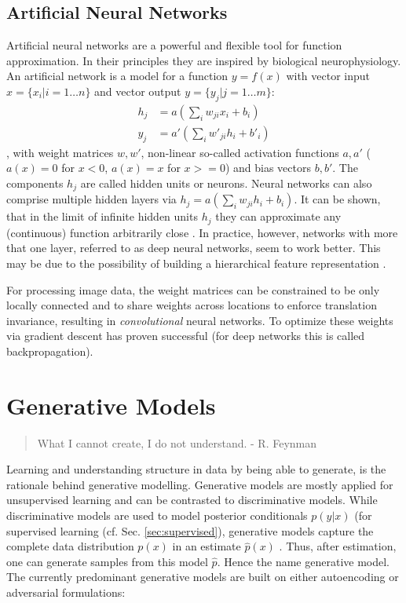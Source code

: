 	\subsection{Artificial Neural Networks}\label{sec:neuralnetworks}
		Artificial neural networks are a powerful and flexible tool for function approximation. In their principles they are inspired by biological neurophysiology. An artificial network is a model for a function $y = f(x)$ with vector input $x = \{ x_i | i = 1 \ldots n \}$ and vector output $y = \{ y_j | j = 1 \ldots m \}$:
		\begin{equation} \label{eq1}
			\begin{split}
				h_j & =  a (\sum_i w_{ji} x_i + b_i)  \\
				y_j & =  a' (\sum_i w'_{ji} h_i + b'_i)
			\end{split}
		\end{equation},
		with weight matrices $w, w'$, non-linear so-called activation functions $a, a'$ (\eg $a(x)=0$ for $x<0$, $a(x)=x$ for $x>=0$) and bias vectors $b, b'$.
		The components $h_j$ are called hidden units or neurons. Neural networks can also comprise multiple hidden layers via $h_j  =  a (\sum_i w_{ji} h_i + b_i)$.
		It can be shown, that in the limit of infinite hidden units $h_j$ they can approximate any (continuous) function arbitrarily close \cite{cybenko89approx, hornik91approx}.
		In practice, however, networks with more that one layer, referred to as deep neural networks, seem to work better. This may be due to the possibility of building a hierarchical feature representation \cite{zeiler14vis}.

		For processing image data, the weight matrices can be constrained to be only locally connected and to share weights across locations to enforce translation invariance, resulting in \textit{convolutional} neural networks.
		To optimize these weights via gradient descent has proven successful (for deep networks this is called backpropagation).

\newpage
\section{Generative Models}\label{sec:genmodel}
	\begin{quote}
	    What I cannot create, I do not understand. - R. Feynman
	\end{quote}
	Learning and understanding structure in data by being able to generate, is the rationale behind generative modelling.
	Generative models are mostly applied for unsupervised learning and can be contrasted to discriminative models. While discriminative models are used to model posterior conditionals $p(y|x)$ (\eg for supervised learning (cf. Sec. \ref{sec:supervised}), generative models capture the complete data distribution $p(x)$ in an estimate $\hat p(x)$ \cite{bishop06pattern}. Thus, after estimation, one can generate samples from this model $\hat p$. Hence the name generative model.
	The currently predominant generative models are built on either autoencoding or adversarial formulations:

